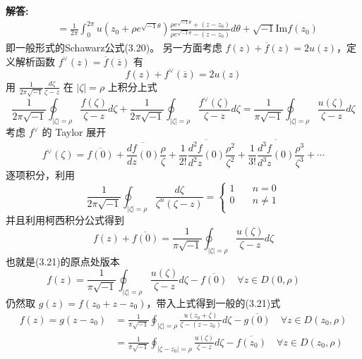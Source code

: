 \documentclass[12pt, a4paper, oneside]{ctexart}
\newenvironment{solution}{\par\noindent\textbf{解答:}}{\par}
\begin{document}
\begin{solution}
\begin{align*}
        &=\frac{1}{2\pi}\int_{0}^{2\pi}u(z_{0}+\rho e^{\sqrt{-1}\theta})\frac{\rho e^{\sqrt{-1}\theta} + (z-z_{0})}{\rho e^{\sqrt{-1}\theta} - (z-z_{0})}d\theta + \sqrt{-1}\mathrm{Im}f(z_{0}) \tag*{(3.20)}
    \end{align*}
    即一般形式的Schawarz公式(3.20)。
    另一方面考虑 $f(z) + \overline{f}(z) = 2u(z)$，定义解析函数 $f^{\vee}(z) = \overline{f}(\overline{z})$ 有
    \begin{equation*}
        f(z) + f^{\vee}(\overline{z}) = 2u(z)
    \end{equation*}
    用 $\frac{1}{2\pi\sqrt{-1}}\frac{d\zeta}{\zeta - z}$ 在 $|\zeta| = \rho$ 上积分上式
    \begin{equation*}
        \frac{1}{2\pi\sqrt{-1}}\oint_{|\zeta|=\rho}\frac{f(\zeta)}{\zeta - z} d\zeta + \frac{1}{2\pi\sqrt{-1}}\oint_{|\zeta|=\rho}\frac{f^{\vee}(\zeta)}{\zeta - z} d\zeta =      \frac{1}{\pi \sqrt{-1}}\oint_{|\zeta|=\rho}\frac{u(\zeta)}{\zeta - z} d\zeta
    \end{equation*}
    考虑 $f^{\vee}$ 的 Taylor 展开
    \begin{equation*}
        f^{\vee}(\zeta) = \overline{f(0)} + \overline{\frac{df}{dz}(0)}\frac{\rho}{\zeta} + \frac{1}{2!}\overline{\frac{d^{2}f}{d^{2}z}(0)}\frac{\rho^{2}}{\zeta^{2}} + \frac{1}{3!}\overline{\frac{d^{3}f}{d^{3}z}(0)}\frac{\rho^{3}}{\zeta^{3}} + \cdots
    \end{equation*}
    逐项积分，利用
    \begin{equation*}
        \frac{1}{2\pi\sqrt{-1}}\oint_{|\zeta|=\rho}\frac{d\zeta}{\zeta^{n}(\zeta - z)}  = 
        \begin{cases}
            1 &\quad n=0\\
            0 &\quad n\not=1\\
        \end{cases}
    \end{equation*}
    并且利用柯西积分公式得到
    \begin{equation*}
        f(z) + \overline{f(0)} = \frac{1}{\pi\sqrt{-1}}\oint_{|\zeta|=\rho}\frac{u(\zeta)}{\zeta - z} d\zeta
    \end{equation*}
    也就是(3.21)的原点处版本
    \begin{equation*}
        f(z)  = \frac{1}{\pi \sqrt{-1}}\oint_{|\zeta|=\rho}\frac{u(\zeta)}{\zeta - z} d\zeta - \overline{f(0)} \quad \forall z \in D(0,\rho) \qquad \tag*{(SII)}
    \end{equation*}
    仍然取 $g(z) = f(z_{0}+z-z_{0})$，带入上式得到一般的(3.21)式
    \begin{align*}
        f(z) = g(z-z_{0}) &= \frac{1}{\pi \sqrt{-1}}\oint_{|\zeta|=\rho}\frac{u(z_{0}+\zeta)}{\zeta - (z-z_{0})} d\zeta - \overline{g(0)} \quad \forall z \in D(z_{0},\rho)\\
        &=\frac{1}{\pi \sqrt{-1}}\oint_{|\zeta-z_{0}|=\rho}\frac{u(\zeta)}{\zeta - z} d\zeta - \overline{f(z_{0})} \quad \forall z \in D(z_{0},\rho)
    \end{align*}
\end{solution}
\end{document}
